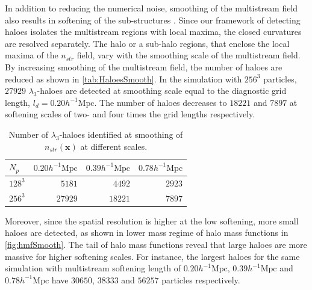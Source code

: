{In addition to reducing the numerical noise, smoothing of the multistream field also results in softening of the sub-structures \cite{Ramachandra2017}. Since our framework of detecting haloes isolates the multistream regions with local maxima, the closed curvatures are resolved separately. The halo or a sub-halo regions, that enclose the local maxima of the $n_{str}$ field, vary with the smoothing scale of the multistream field. By increasing smoothing of the multistream field, the number of haloes are reduced as shown in \autoref{tab:HaloesSmooth}. In the simulation with $256^3$ particles, $27929$ $\lambda_3$-haloes are detected at smoothing scale equal to the diagnostic grid length, $l_d = 0.20 h^{-1} \text{Mpc}$. The number of haloes decreases to $18221$ and $7897$ at softening scales of two- and four times the grid lengths respectively. 

\begin{table}
\centering
  \caption{Number of $\lambda_3$-haloes identified at smoothing of $n_{str}(\mathbf{x})$ at different scales.}
\begin{tabular}{|l|r|r|r|}
\hline
$N_p$  &  $0.20h^{-1} \text{Mpc}$ & $0.39 h^{-1} \text{Mpc}$ & $0.78 h^{-1} \text{Mpc}$ \\ \hline
$128^3$   & $5181$  &  $4492$ & $2923$ \\ \hline
$256^3$   & $27929$  & $18221$ & $7897$ \\ \hline

\end{tabular}
\label{tab:HaloesSmooth}
\end{table}


Moreover, since the spatial resolution is higher at the low softening, more small haloes are detected, as shown in lower mass regime of halo mass functions in \autoref{fig:hmfSmooth}. The tail of halo mass functions reveal that large haloes are more massive for higher softening scales. For instance, the largest haloes for the same simulation with multistream softening length of $0.20 h^{-1} \text{Mpc}$, $0.39 h^{-1} \text{Mpc}$ and $0.78 h^{-1} \text{Mpc}$ have $30650$, $38333$ and $56257$ particles respectively. 

}
